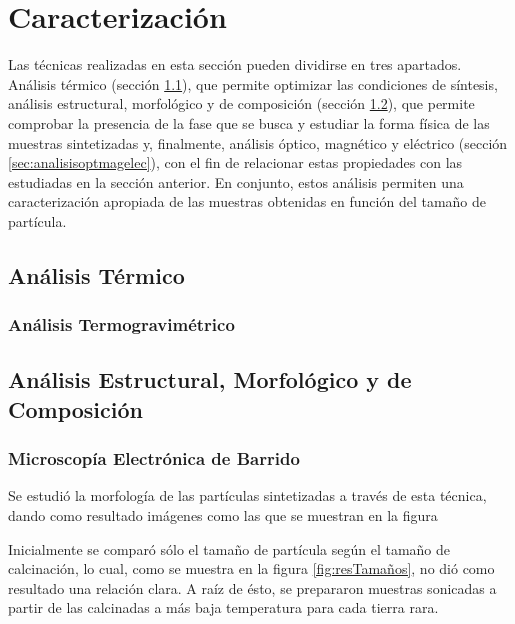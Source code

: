 \documentclass[../main.tex]{subfiles}
\begin{document}
\section{Caracterización}
Las técnicas realizadas en esta sección pueden dividirse en tres apartados. Análisis térmico (sección \ref{sec:analisistermico}), que permite optimizar las condiciones de síntesis, análisis estructural, morfológico y de composición (sección \ref{sec:analisisestruc}), que permite comprobar la presencia de la fase que se busca y estudiar la forma física de las muestras sintetizadas y, finalmente, análisis óptico, magnético y eléctrico (sección \ref{sec:analisisoptmagelec}), con el fin de relacionar estas propiedades con las estudiadas en la sección anterior. En conjunto, estos análisis permiten una caracterización apropiada de las muestras obtenidas en función del tamaño de partícula.
\subsection{Análisis Térmico} \label{sec:analisistermico}
\subsubsection{Análisis Termogravimétrico} \label{sec:TGA}

\subsection{Análisis Estructural, Morfológico y de Composición} \label{sec:analisisestruc}

\subsubsection{Microscopía Electrónica de Barrido}
Se estudió la morfología de las partículas sintetizadas a través de esta técnica, dando como resultado imágenes como las que se muestran en la figura %

Inicialmente se comparó sólo el tamaño de partícula según el tamaño de calcinación, lo cual, como se muestra en la figura \ref{fig:resTamaños}, no dió como resultado una relación clara. A raíz de ésto, se prepararon muestras sonicadas a partir de las calcinadas a más baja temperatura para cada tierra rara.
\end{document}
